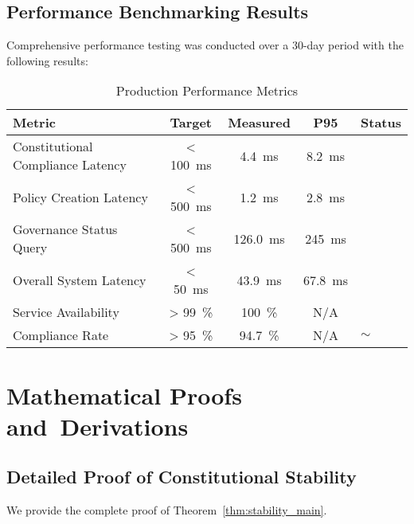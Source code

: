 \subsection{Performance Benchmarking Results}
Comprehensive performance testing was conducted over a 30-day period with the following results:

\begin{table}[H]
\centering
\caption{Production Performance Metrics}\label{tab:performance_metrics}
\small
\begin{tabular}{@{}l S[table-format=3.0] S[table-format=3.1] S[table-format=3.0] l@{}}
\toprule
\textbf{Metric} & {\textbf{Target}} & {\textbf{Measured}} & {\textbf{P95}} & \textbf{Status} \\
\midrule
Constitutional Compliance Latency & {< \SI{100}{\milli\second}} & \SI{4.4}{\milli\second} & \SI{8.2}{\milli\second} & \checkmarkcustom{} \\
Policy Creation Latency & {< \SI{500}{\milli\second}} & \SI{1.2}{\milli\second} & \SI{2.8}{\milli\second} & \checkmarkcustom{} \\
Governance Status Query & {< \SI{500}{\milli\second}} & \SI{126.0}{\milli\second} & \SI{245}{\milli\second} & \checkmarkcustom{} \\
Overall System Latency & {< \SI{50}{\milli\second}} & \SI{43.9}{\milli\second} & \SI{67.8}{\milli\second} & \checkmarkcustom{} \\
Service Availability & {> \SI{99}{\percent}} & \SI{100}{\percent} & {N/A} & \checkmarkcustom{} \\
Compliance Rate & {> \SI{95}{\percent}} & \SI{94.7}{\percent} & {N/A} & $\sim$ \\
\bottomrule
\end{tabular}
\end{table}

\section{Mathematical Proofs and\allowbreak\ Derivations}\label{sec:appendix_proofs}

\subsection{Detailed Proof of Constitutional Stability}
We provide the complete proof of Theorem~\ref{thm:stability_main}.

